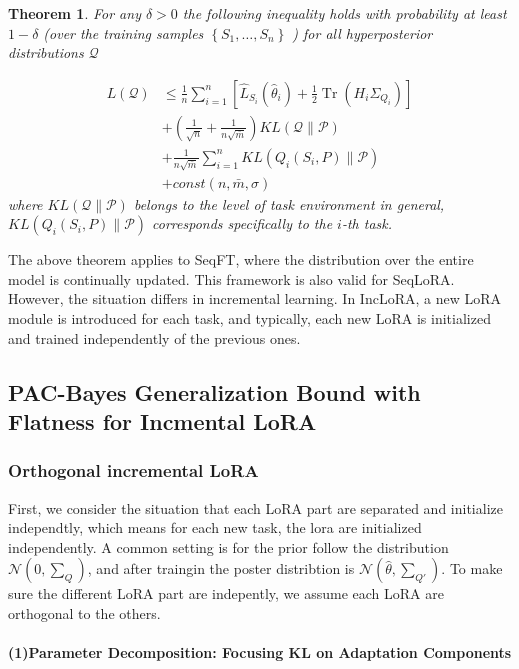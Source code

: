 \documentclass[letterpaper]{article} %
\newtheorem{theorem}{Theorem}
\begin{document}
\begin{theorem} 
For any $\delta>0$ the following inequality holds with probability at least $1-\delta$ (over the training samples $\left\{S_1, \ldots, S_n\right\}$ ) for all hyperposterior distributions $\mathcal{Q}$

$$
\begin{aligned}
 L(\mathcal{Q}) &\leq \frac{1}{n}\sum_{i=1}^n \left[ \widehat{L}_{S_i}(\hat{\theta}_i) + \frac{1}{2}\operatorname{Tr}(H_i \Sigma_{Q_i}) \right] \\
&+(\frac{1}{\sqrt{n}}+ \frac{1}{n \sqrt{\bar{m}}}) K L(\mathcal{Q} \| \mathcal{P}) \\
& +\frac{1}{n \sqrt{\bar{m}}}  \sum_{i=1}^n KL\left(Q_i\left(S_i,P\right) \|\mathcal{P}\right) \\
&+ const(n,\bar{m},\sigma)
\end{aligned}
$$
where $KL(\mathcal{Q} \| \mathcal{P})$ belongs to the level of task environment in general, $KL\left(Q_i\left(S_i,P\right) \|\mathcal{P}\right)$ corresponds specifically to the $i$-th task.
\end{theorem}

The above theorem applies to SeqFT, where the distribution over the entire model is continually updated. This framework is also valid for SeqLoRA. However, the situation differs in incremental learning. In IncLoRA, a new LoRA module is introduced for each task, and typically, each new LoRA is initialized and trained independently of the previous ones. 


\subsection{PAC-Bayes Generalization Bound with Flatness for Incmental LoRA}

\subsubsection{Orthogonal incremental LoRA}

First,  we consider the situation that each LoRA part are separated and initialize independtly, which means for each new task, the lora are initialized independently. A common setting is for the prior follow the distribution $\mathcal{N}(0,\sum_Q)$, and after traingin the poster distribtion is $\mathcal{N}(\hat{\theta},\sum_{Q'})$. To make sure the different LoRA part are indepently, we assume each LoRA are orthogonal to the others. 

\paragraph{(1)Parameter Decomposition: Focusing KL on Adaptation Components}
\end{document}
